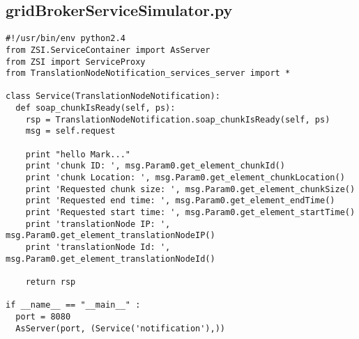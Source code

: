 \subsection{gridBrokerServiceSimulator.py}
\begin{verbatim}
#!/usr/bin/env python2.4
from ZSI.ServiceContainer import AsServer
from ZSI import ServiceProxy
from TranslationNodeNotification_services_server import *

class Service(TranslationNodeNotification):
  def soap_chunkIsReady(self, ps):
    rsp = TranslationNodeNotification.soap_chunkIsReady(self, ps)
    msg = self.request

    print "hello Mark..."
    print 'chunk ID: ', msg.Param0.get_element_chunkId()
    print 'chunk Location: ', msg.Param0.get_element_chunkLocation()
    print 'Requested chunk size: ', msg.Param0.get_element_chunkSize()
    print 'Requested end time: ', msg.Param0.get_element_endTime()
    print 'Requested start time: ', msg.Param0.get_element_startTime()
    print 'translationNode IP: ', msg.Param0.get_element_translationNodeIP()
    print 'translationNode Id: ', msg.Param0.get_element_translationNodeId()
        
    return rsp

if __name__ == "__main__" :
  port = 8080
  AsServer(port, (Service('notification'),))
\end{verbatim} 

